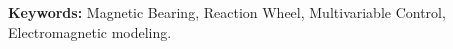 \par
\vspace{1em}
\noindent\textbf{Keywords:} Magnetic Bearing, Reaction Wheel, Multivariable Control, Electromagnetic modeling.

\normalsize 


\newpage


\listoffigures

\listoftables


\tableofcontents

